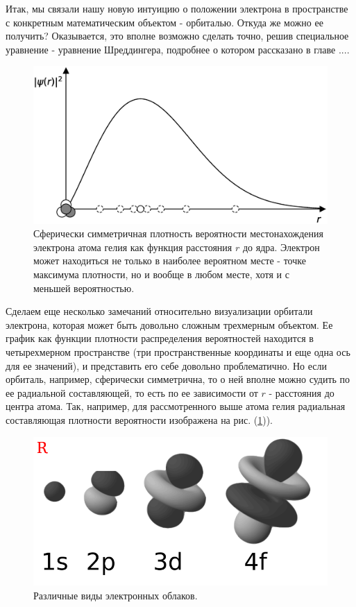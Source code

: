 Итак, мы связали нашу новую интуицию о положении электрона в пространстве с конкретным математическим объектом - орбиталью. 
Откуда же можно ее получить?
Оказывается, это вполне возможно сделать точно, решив специальное уравнение - уравнение Шреддингера, подробнее о котором рассказано в главе ....

\begin{figure}[t!]
   \centering
   \includegraphics[scale=0.4]{images/radial_prob}
   \caption{Сферически симметричная плотность вероятности местонахождения электрона атома гелия как функция расстояния $r$ до ядра. Электрон может находиться не только в наиболее вероятном месте - точке максимума плотности, но и вообще в любом месте, хотя и с меньшей вероятностью.}
   \label{fig:radial_prob}
\end{figure}

Сделаем еще несколько замечаний относительно визуализации орбитали электрона, которая может быть довольно сложным трехмерным объектом.
Ее график как функции плотности распределения вероятностей находится в четырехмерном пространстве (три пространственные координаты и еще одна ось для ее значений), и представить его себе довольно проблематично.
Но если орбиталь, например, сферически симметрична, то о ней вполне можно судить по ее радиальной составляющей, то есть по ее зависимости от $r$ - расстояния до центра атома.
Так, например, для рассмотренного выше атома гелия радиальная составляющая плотности вероятности изображена на рис. (\ref{fig:radial_prob})).

\begin{figure}[t!]
   \centering
   \includegraphics[scale=0.9]{images/electron_clouds_1}
   \caption{Различные виды электронных облаков.}
   \label{fig:electron_clouds_1}
\end{figure}

